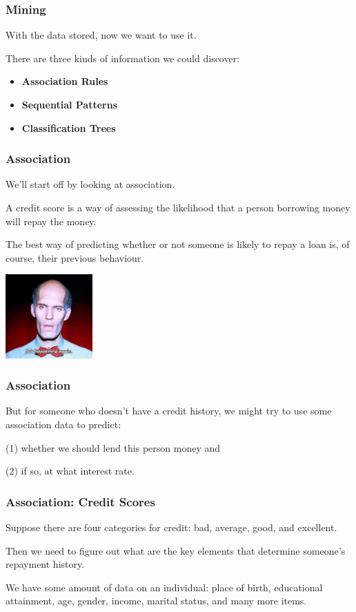 \begin{frame}
\frametitle{Mining}

With the data stored, now we want to use it.

 There are three kinds of information we could discover:

\begin{itemize}
	\item \textbf{Association Rules}
	\item \textbf{Sequential Patterns}
	\item \textbf{Classification Trees}
\end{itemize}

\end{frame}

\begin{frame}
\frametitle{Association}

We'll start off by looking at association. 

A credit score is a way of assessing the likelihood that a person borrowing money will repay the money.

The best way of predicting whether or not someone is likely to repay a loan is, of course, their previous behaviour. 

\begin{center}
	\includegraphics[width=0.25\textwidth]{images/happening-again.jpg}
\end{center}

\end{frame}

\begin{frame}
\frametitle{Association}

But for someone who doesn't have a credit history, we might try to use some association data to predict: 

(1) whether we should lend this person money and 

(2) if so, at what interest rate.

\end{frame}

\begin{frame}
\frametitle{Association: Credit Scores}

Suppose there are four categories for credit: bad, average, good, and excellent. 

Then we need to figure out what are the key elements that determine someone's repayment history. 

We have some amount of data on an individual: place of birth, educational attainment, age, gender, income, marital status, and many more items. 


\end{frame}

